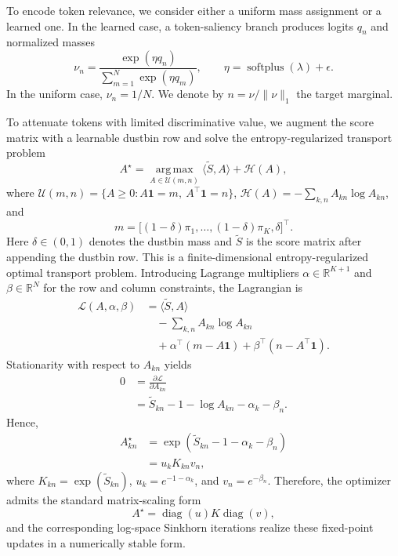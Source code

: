\documentclass[journal]{IEEEtran}
\begin{document}
To encode token relevance, we consider either a uniform mass assignment or a learned one. In the learned case, a token-saliency branch produces logits \(q_n\) and normalized masses
\begin{equation}
\nu_n = \frac{\exp(\eta q_n)}{\sum_{m=1}^N \exp(\eta q_m)},
\qquad \eta = \operatorname{softplus}(\lambda) + \epsilon.
\end{equation}
In the uniform case, \(\nu_n = 1/N\). We denote by \(n = \nu / \|\nu\|_1\) the target marginal.

To attenuate tokens with limited discriminative value, we augment the score matrix with a learnable dustbin row and solve the entropy-regularized transport problem
\begin{equation}
A^\star = \operatorname*{arg\,max}_{A \in \mathcal{U}(m,n)} \langle \tilde{S}, A \rangle + \mathcal{H}(A),
\end{equation}
where \(\mathcal{U}(m,n) = \{A \ge 0 : A\mathbf{1} = m,\ A^\top\mathbf{1} = n\}\), \(\mathcal{H}(A) = -\sum_{k,n} A_{kn}\log A_{kn}\), and
\begin{equation}
m = \big[(1-\delta)\pi_1,\ldots,(1-\delta)\pi_K,\delta\big]^\top.
\end{equation}
Here \(\delta \in (0,1)\) denotes the dustbin mass and \(\tilde{S}\) is the score matrix after appending the dustbin row. This is a finite-dimensional entropy-regularized optimal transport problem. Introducing Lagrange multipliers \(\alpha \in \mathbb{R}^{K+1}\) and \(\beta \in \mathbb{R}^{N}\) for the row and column constraints, the Lagrangian is
\begin{align}
\mathcal{L}(A,\alpha,\beta)
&= \langle \tilde{S},A\rangle \nonumber\\
&\quad - \sum_{k,n}A_{kn}\log A_{kn} \nonumber\\
&\quad + \alpha^\top(m-A\mathbf{1}) + \beta^\top(n-A^\top\mathbf{1}).
\end{align}
Stationarity with respect to \(A_{kn}\) yields
\begin{align}
0 &= \frac{\partial \mathcal{L}}{\partial A_{kn}} \nonumber\\
  &= \tilde{S}_{kn} - 1 - \log A_{kn} - \alpha_k - \beta_n.
\end{align}
Hence,
\begin{align}
A^\star_{kn}
&= \exp(\tilde{S}_{kn} - 1 - \alpha_k - \beta_n) \nonumber\\
&= u_k K_{kn} v_n,
\end{align}
where \(K_{kn} = \exp(\tilde{S}_{kn})\), \(u_k = e^{-1-\alpha_k}\), and \(v_n = e^{-\beta_n}\). Therefore, the optimizer admits the standard matrix-scaling form
\begin{equation}
A^\star = \operatorname{diag}(u)K\operatorname{diag}(v),
\end{equation}
and the corresponding log-space Sinkhorn iterations realize these fixed-point updates in a numerically stable form.
\end{document}
